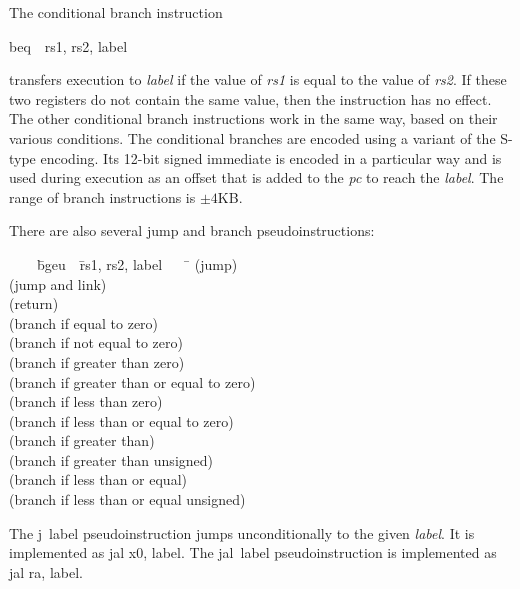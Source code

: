 \documentclass[11pt, twoside, pdftex]{article}
\newenvironment{ctabbing}%
{\begin{center}\begin{minipage}{\textwidth}\begin{tabbing}}
{\end{tabbing}\end{minipage}\end{center}}
\begin{document}
The conditional branch instruction
\vspace{-\baselineskip}
\begin{center}
{\sf beq~~rs1, rs2, label}
\end{center}
\noindent
transfers execution to {\it label} if the value of {\it rs1} is equal to the value of 
{\it rs2}. If these two registers do not contain the same value, then the instruction has
no effect. The other conditional branch instructions work in the same way, based on
their various conditions. The conditional branches are encoded using a variant of 
the S-type encoding. Its 12-bit signed immediate is encoded in a particular way and is used 
during execution as an offset that is added to the {\it pc} to reach the {\it label}.
The range of branch instructions is $\pm 4$KB.

There are also several jump and branch pseudoinstructions:
\begin{ctabbing}
~~~~\={\sf bgeu}~~\={\sf rs1, rs2, label}~~~~\=\kill
{}  \>(jump)\\
  \>(jump and link)\\
 \>\>(return)\\
  \>(branch if equal to zero)\\
  \>(branch if not equal to zero)\\
  \>(branch if greater than zero)\\
  \>(branch if greater than or equal to zero)\\
  \>(branch if less than zero)\\
  \>(branch if less than or equal to zero)\\
  \>(branch if greater than)\\
  \>(branch if greater than unsigned)\\
  \>(branch if less than or equal)\\
  \>(branch if less than or equal unsigned)\\
\end{ctabbing}
\vspace{-\baselineskip}
The {\sf j~label} pseudoinstruction jumps unconditionally 
to the given {\it label}. It is implemented
as {\sf jal x0, label}. The {\sf jal~label} pseudoinstruction is implemented as
{\sf jal ra, label}.
\end{document}
